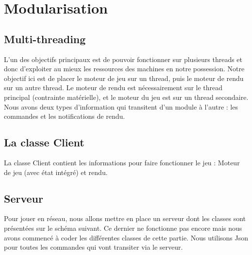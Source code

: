 \section{Modularisation}

\subsection{Multi-threading}

L'un des objectifs principaux est de pouvoir fonctionner sur plusieurs threads et donc d'exploiter au mieux les ressources des machines en notre possession. 
Notre objectif ici est de placer le moteur de jeu sur un thread, puis le moteur de rendu sur un autre
thread. Le moteur de rendu est nécessairement sur le thread principal (contrainte matérielle), et le moteur
du jeu est sur un thread secondaire. Nous avons deux types d’information qui transitent d’un module à l’autre :
les commandes et les notifications de rendu.

\subsection{La classe Client}

La classe Client contient les informations pour faire fonctionner le jeu : Moteur de jeu (avec état intégré) et rendu.

\subsection{Serveur}

Pour jouer en réseau, nous allons mettre en place un serveur dont les classes sont présentées sur le schéma suivant. Ce dernier ne fonctionne pas encore mais nous avons commencé à coder les différentes classes de cette partie. 
Nous utilisons Json pour toutes les commandes qui vont transiter via le serveur. 

